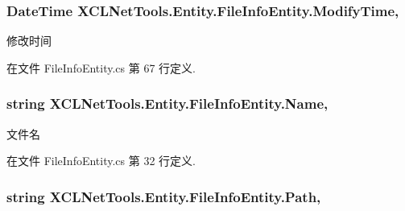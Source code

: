 \subsubsection[{\texorpdfstring{Modify\+Time}{ModifyTime}}]{\setlength{\rightskip}{0pt plus 5cm}Date\+Time X\+C\+L\+Net\+Tools.\+Entity.\+File\+Info\+Entity.\+Modify\+Time\hspace{0.3cm}{\ttfamily [get]}, {\ttfamily [set]}}\hypertarget{class_x_c_l_net_tools_1_1_entity_1_1_file_info_entity_a64c6633bec7e4d547632c122dbaad9f8}{}\label{class_x_c_l_net_tools_1_1_entity_1_1_file_info_entity_a64c6633bec7e4d547632c122dbaad9f8}


修改时间 



在文件 File\+Info\+Entity.\+cs 第 67 行定义.

\subsubsection[{\texorpdfstring{Name}{Name}}]{\setlength{\rightskip}{0pt plus 5cm}string X\+C\+L\+Net\+Tools.\+Entity.\+File\+Info\+Entity.\+Name\hspace{0.3cm}{\ttfamily [get]}, {\ttfamily [set]}}\hypertarget{class_x_c_l_net_tools_1_1_entity_1_1_file_info_entity_a15a2bb6c738c32250f00604b6636cae4}{}\label{class_x_c_l_net_tools_1_1_entity_1_1_file_info_entity_a15a2bb6c738c32250f00604b6636cae4}


文件名 



在文件 File\+Info\+Entity.\+cs 第 32 行定义.

\subsubsection[{\texorpdfstring{Path}{Path}}]{\setlength{\rightskip}{0pt plus 5cm}string X\+C\+L\+Net\+Tools.\+Entity.\+File\+Info\+Entity.\+Path\hspace{0.3cm}{\ttfamily [get]}, {\ttfamily [set]}}\hypertarget{class_x_c_l_net_tools_1_1_entity_1_1_file_info_entity_a67f485c1a1af6205351305756d515e98}{}\label{class_x_c_l_net_tools_1_1_entity_1_1_file_info_entity_a67f485c1a1af6205351305756d515e98}


